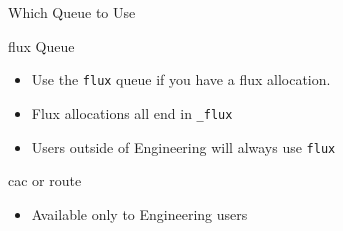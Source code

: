 \documentclass[handout]{beamer}
\begin{document}
  \begin{frame}{Which Queue to Use}
   \begin{block}{flux Queue}
    \begin{itemize}
     \item Use the \texttt{flux} queue if you have a flux allocation. 
     \item Flux allocations all end in \texttt{\_flux}
     \item Users outside of Engineering will always use \texttt{flux}
    \end{itemize}
   \end{block}
   \begin{block}{cac or route}
    \begin{itemize}
     \item Available only to Engineering users
    \end{itemize}
   \end{block}
  \end{frame}
\end{document}
